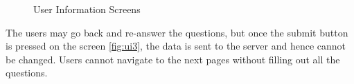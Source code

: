 \begin{figure}[htp]
  \hspace{2em}
  \caption{User Information Screens}
  \label{fig:ui}
\end{figure}

The users may go back and re-answer the questions, but once the submit button is pressed on the screen \ref{fig:ui3}, the data is sent to the server
and hence cannot be changed. Users cannot navigate to the next pages without filling out all the questions.

